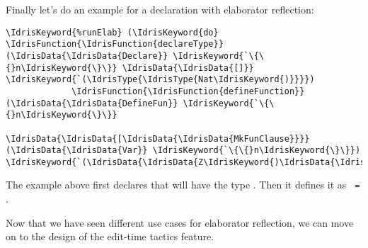 Finally let's do an example for a declaration with elaborator reflection:

\begin{Verbatim}[framesep=2mm, label=\footnotesize{\normalfont{Idris}}, labelposition=topline]
\IdrisKeyword{%runElab} (\IdrisKeyword{do} \IdrisFunction{\IdrisFunction{declareType}} (\IdrisData{\IdrisData{Declare}} \IdrisKeyword{`\{\{}n\IdrisKeyword{\}\}} \IdrisData{\IdrisData{[]}} \IdrisKeyword{`(\IdrisType{\IdrisType{Nat\IdrisKeyword{)}}}})
             \IdrisFunction{\IdrisFunction{defineFunction}} (\IdrisData{\IdrisData{DefineFun}} \IdrisKeyword{`\{\{}n\IdrisKeyword{\}\}}
                               \IdrisData{\IdrisData{[\IdrisData{\IdrisData{MkFunClause}}}} (\IdrisData{\IdrisData{Var}} \IdrisKeyword{`\{\{}n\IdrisKeyword{\}\}}) \IdrisKeyword{`(\IdrisData{\IdrisData{Z\IdrisKeyword{)\IdrisData{\IdrisData{]}}}}}}))
\end{Verbatim}

The example above first declares that  will have the type .
Then it defines it as \texttt{ = }.

Now that we have seen different use cases for elaborator reflection, we can move on to the
design of the edit-time tactics feature.



